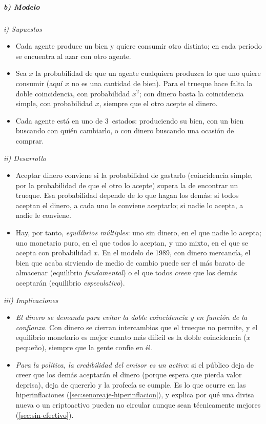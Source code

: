 \documentclass[11pt]{article}
\begin{document}
\subparagraph{b) Modelo}

\hspace*{3.6em}\emph{i) Supuestos}

\begin{itemize}
\item Cada agente produce un bien y quiere consumir otro distinto; en cada periodo se encuentra al azar con otro agente.
\item Sea $x$ la probabilidad de que un agente cualquiera produzca lo que uno quiere consumir (aquí $x$ no es una cantidad de bien). Para el trueque hace falta la doble coincidencia, con probabilidad $x^2$; con dinero basta la coincidencia simple, con probabilidad $x$, siempre que el otro acepte el dinero.
\item Cada agente está en uno de 3~estados: produciendo su bien, con un bien buscando con quién cambiarlo, o con dinero buscando una ocasión de comprar.
\end{itemize}

\hspace*{3.6em}\emph{ii) Desarrollo}

\begin{itemize}
\item Aceptar dinero conviene si la probabilidad de gastarlo (coincidencia simple, por la probabilidad de que el otro lo acepte) supera la de encontrar un trueque. Esa probabilidad depende de lo que hagan los demás: si todos aceptan el dinero, a cada uno le conviene aceptarlo; si nadie lo acepta, a nadie le conviene.
\item Hay, por tanto, \emph{equilibrios múltiples}\nocite{KiyotakiWright1993Search}: uno sin dinero, en el que nadie lo acepta; uno monetario puro, en el que todos lo aceptan, y uno mixto, en el que se acepta con probabilidad $x$. En el modelo de 1989, con dinero mercancía, el bien que acaba sirviendo de medio de cambio puede ser el más barato de almacenar (equilibrio \emph{fundamental}) o el que todos \emph{creen} que los demás aceptarán (equilibrio \emph{especulativo}).
\end{itemize}

\hspace*{3.6em}\emph{iii) Implicaciones}

\begin{itemize}
\item \emph{El dinero se demanda para evitar la doble coincidencia y en función de la confianza}. Con dinero se cierran intercambios que el trueque no permite, y el equilibrio monetario es mejor cuanto más difícil es la doble coincidencia ($x$ pequeño), siempre que la gente confíe en él.
\item \emph{Para la política, la credibilidad del emisor es un activo}: si el público deja de creer que los demás aceptarán el dinero (porque espera que pierda valor deprisa), deja de quererlo y la profecía se cumple. Es lo que ocurre en las hiperinflaciones (\ref{sec:senoreaje-hiperinflacion}), y explica por qué una divisa nueva o un criptoactivo pueden no circular aunque sean técnicamente mejores (\ref{sec:sin-efectivo}).
\end{itemize}
\end{document}
